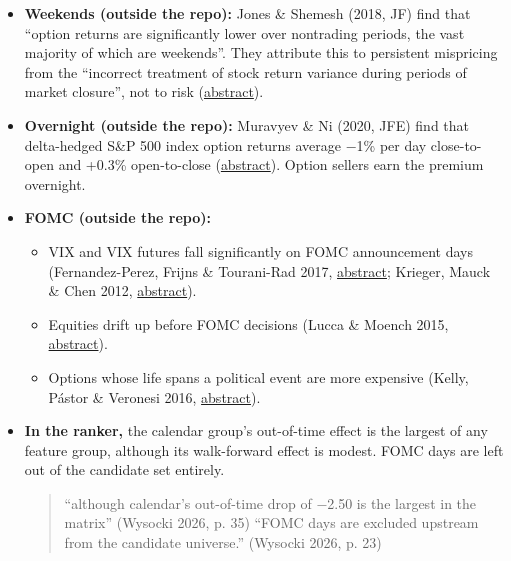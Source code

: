 \documentclass{article}
\begin{document}
\begin{itemize}

\item \textbf{Weekends (outside the repo):} Jones \& Shemesh (2018, JF) find that ``option returns are significantly lower over nontrading periods, the vast majority of which are weekends''. They attribute this to persistent mispricing from the ``incorrect treatment of stock return variance during periods of market closure'', not to risk (\href{https://ideas.repec.org/a/bla/jfinan/v73y2018i2p861-900.html}{abstract}).

\item \textbf{Overnight (outside the repo):} Muravyev \& Ni (2020, JFE) find that delta-hedged S\&P 500 index option returns average \ensuremath{-}1\% per day close-to-open and +0.3\% open-to-close (\href{https://ideas.repec.org/a/eee/jfinec/v136y2020i1p219-238.html}{abstract}). Option sellers earn the premium overnight.

\item \textbf{FOMC (outside the repo):}

\begin{itemize}

\item VIX and VIX futures fall significantly on FOMC announcement days (Fernandez-Perez, Frijns \& Tourani-Rad 2017, \href{https://ideas.repec.org/a/eee/empfin/v41y2017icp187-199.html}{abstract}; Krieger, Mauck \& Chen 2012, \href{https://ideas.repec.org/a/kap/fmktpm/v26y2012i3p315-331.html}{abstract}).

\item Equities drift up before FOMC decisions (Lucca \& Moench 2015, \href{https://ideas.repec.org/a/bla/jfinan/v70y2015i1p329-371.html}{abstract}).

\item Options whose life spans a political event are more expensive (Kelly, Pástor \& Veronesi 2016, \href{https://ideas.repec.org/a/bla/jfinan/v71y2016i5p2417-2480.html}{abstract}).

\end{itemize}

\item \textbf{In the ranker,} the calendar group's out-of-time effect is the largest of any feature group, although its walk-forward effect is modest. FOMC days are left out of the candidate set entirely.

\begin{quote}``although calendar's out-of-time drop of \ensuremath{-}2.50 is the largest in the matrix'' (Wysocki 2026, p. 35) ``FOMC days are excluded upstream from the candidate universe.'' (Wysocki 2026, p. 23)\end{quote}

\end{itemize}
\end{document}
